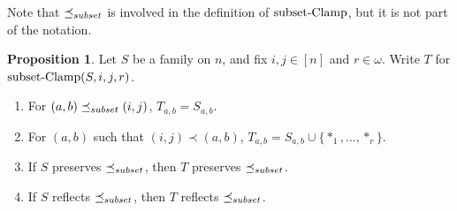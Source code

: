 \documentclass[12pt]{article}
\theoremstyle{definition}
\newtheorem{proposition}{Proposition}
\newcommand{\set}[1]{\{ #1 \}}
\newcommand{\rem}[1]{\relax}
\begin{document}
Note that $\preceq_{\scriptsize subset}$ is involved in the definition of $\mbox{subset-Clamp}$, but it is not
part of the notation.


\begin{proposition}
Let $S$ be a family on $n$, and fix $i,j\in[n]$
and $r\in\omega$.
Write $T$ for $\mbox{subset-Clamp}(S,i,j,r)$.
\begin{enumerate}
    \item For $(a,b)\preceq_{\scriptsize subset} (i,j)$, $T_{a,b} = S_{a,b}$.
    \label{part-easy}
\item For $(a,b)$ such that $(i,j) \prec (a,b)$, $T_{a,b} =  S_{a,b}\cup\set{*_1,\ldots, *_r}$.
\label{part-bigger}
\rem{    \item For all $(a,b), (c,d)$
    in \[\Pairs(n)\setminus
    \set{(i,j),(i,i),(j,j)} \]
we have 
\[ s_{a,b} - s_{c,d} = t_{a,b} - t_{c,d}.\]
}
\item If $S$ preserves $\preceq_{\scriptsize subset}$,
then $T$  preserves $\preceq_{\scriptsize subset}$.
\label{part-preserve}
\item If $S$  reflects $\preceq_{\scriptsize subset}$,
then $T$  reflects $\preceq_{\scriptsize subset}$.
\label{part-reflect}
\end{enumerate}
\label{proposition-sClamp}
\end{proposition}
\end{document}
